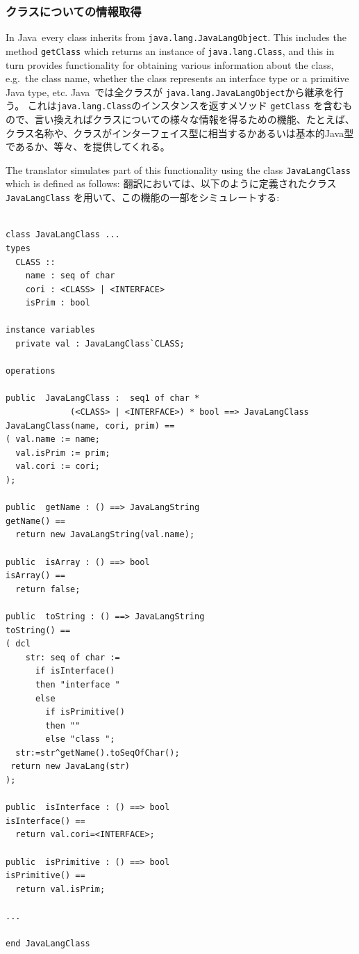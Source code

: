 \documentclass[\pformat,12pt]{jarticle}
\newcommand{\JAVA}{Java}
\begin{document}
\subsubsection{クラスについての情報取得}\label{getclass}

In \JAVA\ every class inherits from \texttt{java.lang.JavaLangObject}.
This includes the method \texttt{getClass} which returns an instance
of \texttt{java.lang.Class}, and this in turn provides functionality
for obtaining various information about the class, e.g.\ the class
name, whether the class represents an interface type or a primitive
Java type, etc. 
 \JAVA\ では全クラスが \texttt{java.lang.JavaLangObject}から継承を行う。
これは\texttt{java.lang.Class}のインスタンスを返すメソッド \texttt{getClass} を含むもので、言い換えればクラスについての様々な情報を得るための機能、たとえば、クラス名称や、クラスがインターフェイス型に相当するかあるいは基本的Java型であるか、等々、を提供してくれる。 

The translator simulates part of this functionality using the class
\texttt{JavaLangClass} which is defined as follows:
翻訳においては、以下のように定義されたクラス\texttt{JavaLangClass} を用いて、この機能の一部をシミュレートする:

\begin{small}
\begin{verbatim}

class JavaLangClass ...
types
  CLASS ::
    name : seq of char
    cori : <CLASS> | <INTERFACE>
    isPrim : bool

instance variables
  private val : JavaLangClass`CLASS;

operations 

public  JavaLangClass :  seq1 of char * 
             (<CLASS> | <INTERFACE>) * bool ==> JavaLangClass
JavaLangClass(name, cori, prim) == 
( val.name := name;
  val.isPrim := prim;
  val.cori := cori;
);

public  getName : () ==> JavaLangString
getName() == 
  return new JavaLangString(val.name);

public  isArray : () ==> bool 
isArray() == 
  return false;

public  toString : () ==> JavaLangString
toString() == 
( dcl
    str: seq of char :=
      if isInterface()
      then "interface "
      else 
        if isPrimitive()
        then ""
        else "class ";
  str:=str^getName().toSeqOfChar();
 return new JavaLang(str)
);

public  isInterface : () ==> bool 
isInterface() == 
  return val.cori=<INTERFACE>;

public  isPrimitive : () ==> bool 
isPrimitive() == 
  return val.isPrim;

...

end JavaLangClass

\end{verbatim}
\end{small}
\end{document}
